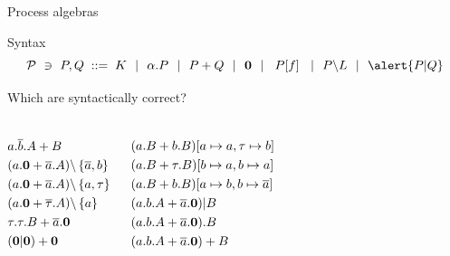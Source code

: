 \documentclass[aspectratio=169]{beamer}
\begin{document}
\begin{slide}{Process algebras}
\small

\begin{block}{Syntax}
\begin{equation*}
\mathcal{P} ~\ni~ P,Q\; ::=\; K ~~|~~ \alpha.P ~~|~~ P + Q ~~|~~ \cnil
        ~~|~~ \crn P f  ~~|~~ P\backslash L ~~|~~  \alert{P|Q}
\end{equation*}
\end{block}

\begin{exampleblock}{\exercise Which are syntactically correct?}
\begin{columns}
  \begin{align}
    & a.\ainv b.A+B\\&
    (a.\cnil + \ainv a.A) \backslash \set{\ainv{a},b}\\&
    (a.\cnil + \ainv a.A) \backslash \set{a,\tau}\\& %
    (a.\cnil + \ainv{\tau}.A) \backslash \set{a}\\& %
    \tau.\tau.B + \ainv a.\cnil %
    \\&
    (\cnil | \cnil) + \cnil
  \end{align}

  \begin{align} &
    (a.B + b.B)[a\mapsto a,\tau\mapsto b]\\&
    (a.B + \tau.B)[b\mapsto a,b\mapsto a]\\& %
    (a.B + b.B)[a\mapsto b,b\mapsto \ainv a]\\& %
    (a.b.A + \ainv a.\cnil)|B\\&
    (a.b.A + \ainv a.\cnil).B\\&
    (a.b.A + \ainv a.\cnil)+B
  \end{align}
\end{columns}
\end{exampleblock}

\end{slide}

\end{document}
